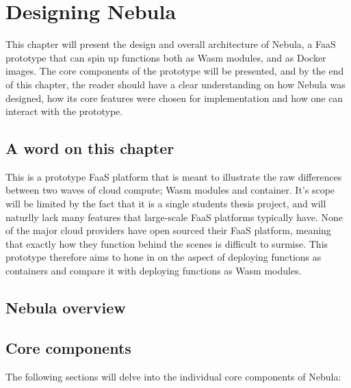 \documentclass[
  table]{report}
\begin{document}
\chapter{Designing Nebula}

This chapter will present the design and overall architecture of Nebula,
a \ac{FaaS} prototype that can spin up functions both as \ac{Wasm}
modules, and as Docker images. The core components of the prototype will
be presented, and by the end of this chapter, the reader should have a
clear understanding on how Nebula was designed, how its core features
were chosen for implementation and how one can interact with the
prototype.

\section{A word on this chapter}

This is a prototype FaaS platform that is meant to illustrate the raw
differences between two waves of cloud compute; \ac{Wasm} modules and
container. It's scope will be limited by the fact that it is a single
students thesis project, and will naturlly lack many features that
large-scale FaaS platforms typically have. None of the major cloud
providers have open sourced their FaaS platform, meaning that exactly
how they function behind the scenes is difficult to surmise. This
prototype therefore aims to hone in on the aspect of deploying functions
as containers and compare it with deploying functions as \ac{Wasm}
modules.

\section{Nebula overview}


\section{Core components}

The following sections will delve into the individual core components of
Nebula:
\end{document}
